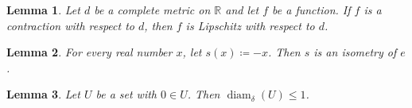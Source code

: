 \documentclass{article}
\newtheorem{lemma}{Lemma}
\begin{document}
\begin{lemma}\label{banach}
Let $d$ be a complete metric on $\mathbb{R}$ and let $f$ be a function. If $f$ is a contraction with respect to $d$, then $f$ is Lipschitz with respect to $d$.
\end{lemma}

\begin{lemma}\label{isometry}
For every real number $x$, let $s(x)\coloneqq -x$. Then $s$ is an isometry of $e$.
\end{lemma}

\begin{lemma}\label{diameter}
Let $U$ be a set with $0\in U$. Then $\operatorname{diam}_\delta(U)\le1$.
\end{lemma}
\end{document}
